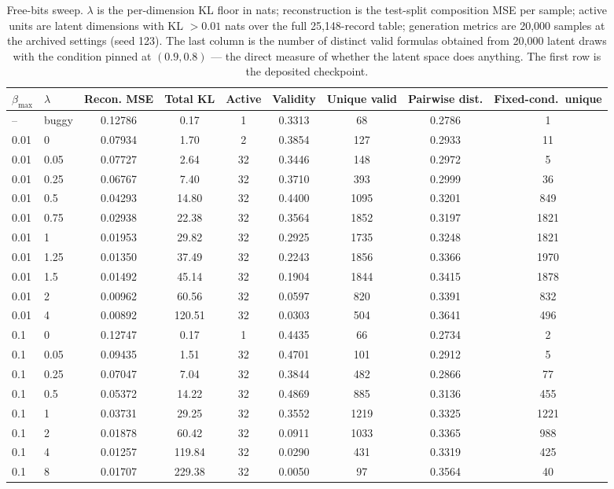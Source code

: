\begin{table}[t]
\centering
\caption{Free-bits sweep. $\lambda$ is the per-dimension KL floor in nats; reconstruction is the test-split composition MSE per sample; active units are latent dimensions with KL $>0.01$ nats over the full 25{,}148-record table; generation metrics are 20{,}000 samples at the archived settings (seed 123). The last column is the number of distinct valid formulas obtained from 20{,}000 latent draws with the condition pinned at $(0.9, 0.8)$ --- the direct measure of whether the latent space does anything. The first row is the deposited checkpoint.}
\label{tab:a8_freebits_sweep}
\begin{tabular}{llccccccc}
\toprule
$\beta_{\max}$ & $\lambda$ & Recon. MSE & Total KL & Active & Validity & Unique valid & Pairwise dist. & Fixed-cond.\ unique \\
\midrule
-- & buggy & 0.12786 & 0.17 & 1 & 0.3313 & 68 & 0.2786 & 1 \\
\midrule
0.01 & 0 & 0.07934 & 1.70 & 2 & 0.3854 & 127 & 0.2933 & 11 \\
0.01 & 0.05 & 0.07727 & 2.64 & 32 & 0.3446 & 148 & 0.2972 & 5 \\
0.01 & 0.25 & 0.06767 & 7.40 & 32 & 0.3710 & 393 & 0.2999 & 36 \\
0.01 & 0.5 & 0.04293 & 14.80 & 32 & 0.4400 & 1095 & 0.3201 & 849 \\
0.01 & 0.75 & 0.02938 & 22.38 & 32 & 0.3564 & 1852 & 0.3197 & 1821 \\
0.01 & 1 & 0.01953 & 29.82 & 32 & 0.2925 & 1735 & 0.3248 & 1821 \\
0.01 & 1.25 & 0.01350 & 37.49 & 32 & 0.2243 & 1856 & 0.3366 & 1970 \\
0.01 & 1.5 & 0.01492 & 45.14 & 32 & 0.1904 & 1844 & 0.3415 & 1878 \\
0.01 & 2 & 0.00962 & 60.56 & 32 & 0.0597 & 820 & 0.3391 & 832 \\
0.01 & 4 & 0.00892 & 120.51 & 32 & 0.0303 & 504 & 0.3641 & 496 \\
\midrule
0.1 & 0 & 0.12747 & 0.17 & 1 & 0.4435 & 66 & 0.2734 & 2 \\
0.1 & 0.05 & 0.09435 & 1.51 & 32 & 0.4701 & 101 & 0.2912 & 5 \\
0.1 & 0.25 & 0.07047 & 7.04 & 32 & 0.3844 & 482 & 0.2866 & 77 \\
0.1 & 0.5 & 0.05372 & 14.22 & 32 & 0.4869 & 885 & 0.3136 & 455 \\
0.1 & 1 & 0.03731 & 29.25 & 32 & 0.3552 & 1219 & 0.3325 & 1221 \\
0.1 & 2 & 0.01878 & 60.42 & 32 & 0.0911 & 1033 & 0.3365 & 988 \\
0.1 & 4 & 0.01257 & 119.84 & 32 & 0.0290 & 431 & 0.3319 & 425 \\
0.1 & 8 & 0.01707 & 229.38 & 32 & 0.0050 & 97 & 0.3564 & 40 \\
\bottomrule
\end{tabular}
\end{table}

